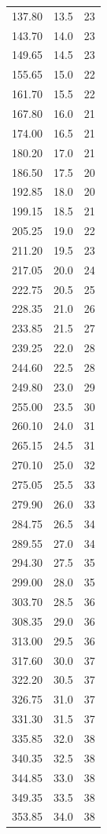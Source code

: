 \documentclass[12pt]{article}
\begin{document}
\begin{small}
\begin{longtable}{S[table-format=3.2] S[table-format=2.1] S[table-format=2.0]}
137.80 & 13.5 & 23 \\
143.70 & 14.0 & 23 \\
149.65 & 14.5 & 23 \\
155.65 & 15.0 & 22 \\
161.70 & 15.5 & 22 \\
167.80 & 16.0 & 21 \\
174.00 & 16.5 & 21 \\
180.20 & 17.0 & 21 \\
186.50 & 17.5 & 20 \\
192.85 & 18.0 & 20 \\
199.15 & 18.5 & 21 \\
205.25 & 19.0 & 22 \\
211.20 & 19.5 & 23 \\
217.05 & 20.0 & 24 \\
222.75 & 20.5 & 25 \\
228.35 & 21.0 & 26 \\
233.85 & 21.5 & 27 \\
239.25 & 22.0 & 28 \\
244.60 & 22.5 & 28 \\
249.80 & 23.0 & 29 \\
255.00 & 23.5 & 30 \\
260.10 & 24.0 & 31 \\
265.15 & 24.5 & 31 \\
270.10 & 25.0 & 32 \\
275.05 & 25.5 & 33 \\
279.90 & 26.0 & 33 \\
284.75 & 26.5 & 34 \\
289.55 & 27.0 & 34 \\
294.30 & 27.5 & 35 \\
299.00 & 28.0 & 35 \\
303.70 & 28.5 & 36 \\
308.35 & 29.0 & 36 \\
313.00 & 29.5 & 36 \\
317.60 & 30.0 & 37 \\
322.20 & 30.5 & 37 \\
326.75 & 31.0 & 37 \\
331.30 & 31.5 & 37 \\
335.85 & 32.0 & 38 \\
340.35 & 32.5 & 38 \\
344.85 & 33.0 & 38 \\
349.35 & 33.5 & 38 \\
353.85 & 34.0 & 38 \\

\end{longtable}
\end{small}
\end{document}

